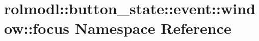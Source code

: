 \hypertarget{namespacerolmodl_1_1button__state_1_1event_1_1window_1_1focus}{}\section{rolmodl\+::button\+\_\+state\+::event\+::window\+::focus Namespace Reference}
\label{namespacerolmodl_1_1button__state_1_1event_1_1window_1_1focus}

